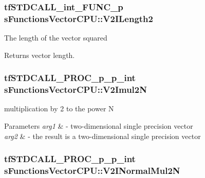 \hypertarget{structs_functions_vector_c_p_u_a9280b4c6f04adbdbe6d815e109595312}{
\subsubsection[{V2\-I\-Length2}]{\setlength{\rightskip}{0pt plus 5cm}tf\-S\-T\-D\-C\-A\-L\-L\-\_\-int\-\_\-\-F\-U\-N\-C\-\_\-p s\-Functions\-Vector\-C\-P\-U\-::\-V2\-I\-Length2}}\label{structs_functions_vector_c_p_u_a9280b4c6f04adbdbe6d815e109595312}
The length of the vector squared \begin{DoxyReturn}{Returns}
vector length. 
\end{DoxyReturn}
\hypertarget{structs_functions_vector_c_p_u_afa4818ba9fd4b40a003cd1f47f351dda}{
\subsubsection[{V2\-Imul2\-N}]{\setlength{\rightskip}{0pt plus 5cm}tf\-S\-T\-D\-C\-A\-L\-L\-\_\-\-P\-R\-O\-C\-\_\-p\-\_\-p\-\_\-int s\-Functions\-Vector\-C\-P\-U\-::\-V2\-Imul2\-N}}\label{structs_functions_vector_c_p_u_afa4818ba9fd4b40a003cd1f47f351dda}
multiplication by 2 to the power N 
\begin{DoxyParams}{Parameters}
{\em arg1} & -\/ two-\/dimensional single precision vector \\
\hline
{\em arg2} & -\/ the result is a two-\/dimensional single precision vector \\
\hline
\end{DoxyParams}
\hypertarget{structs_functions_vector_c_p_u_a0918eb98630b55ea99499e206aa8d144}{
\subsubsection[{V2\-I\-Normal\-Mul2\-N}]{\setlength{\rightskip}{0pt plus 5cm}tf\-S\-T\-D\-C\-A\-L\-L\-\_\-\-P\-R\-O\-C\-\_\-p\-\_\-p\-\_\-int s\-Functions\-Vector\-C\-P\-U\-::\-V2\-I\-Normal\-Mul2\-N}}\label{structs_functions_vector_c_p_u_a0918eb98630b55ea99499e206aa8d144}
